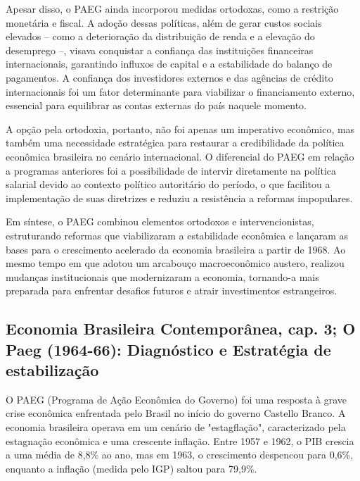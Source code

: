 \documentclass[a4paper,12pt]{article}[abntex2]
\begin{document}
Apesar disso, o PAEG ainda incorporou medidas ortodoxas, como a restrição monetária e fiscal. A adoção dessas políticas, além de gerar custos sociais elevados – como a deterioração da distribuição de renda e a elevação do desemprego –, visava conquistar a confiança das instituições financeiras internacionais, garantindo influxos de capital e a estabilidade do balanço de pagamentos. A confiança dos investidores externos e das agências de crédito internacionais foi um fator determinante para viabilizar o financiamento externo, essencial para equilibrar as contas externas do país naquele momento.

A opção pela ortodoxia, portanto, não foi apenas um imperativo econômico, mas também uma necessidade estratégica para restaurar a credibilidade da política econômica brasileira no cenário internacional. O diferencial do PAEG em relação a programas anteriores foi a possibilidade de intervir diretamente na política salarial devido ao contexto político autoritário do período, o que facilitou a implementação de suas diretrizes e reduziu a resistência a reformas impopulares.

Em síntese, o PAEG combinou elementos ortodoxos e intervencionistas, estruturando reformas que viabilizaram a estabilidade econômica e lançaram as bases para o crescimento acelerado da economia brasileira a partir de 1968. Ao mesmo tempo em que adotou um arcabouço macroeconômico austero, realizou mudanças institucionais que modernizaram a economia, tornando-a mais preparada para enfrentar desafios futuros e atrair investimentos estrangeiros.

\subsection{\textbf{Economia Brasileira Contemporânea, cap. 3; O Paeg (1964-66): Diagnóstico e Estratégia de estabilização}}

O PAEG (Programa de Ação Econômica do Governo) foi uma resposta à grave crise econômica enfrentada pelo Brasil no início do governo Castello Branco. A economia brasileira operava em um cenário de "estagflação", caracterizado pela estagnação econômica e uma crescente inflação. Entre 1957 e 1962, o PIB crescia a uma média de 8,8\% ao ano, mas em 1963, o crescimento despencou para 0,6\%, enquanto a inflação (medida pelo IGP) saltou para 79,9\%.
\end{document}
